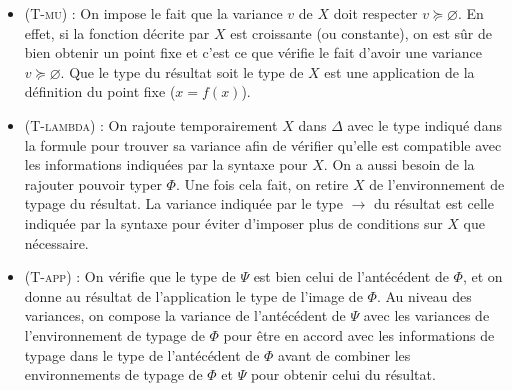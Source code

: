 \documentclass{rapport}
\theoremstyle{plain}
\theoremstyle{remark}
\theoremstyle{definition}
\begin{document}
\begin{itemize}
	\item (\textsc{T-mu}) : On impose le fait que la variance $v$ de $X$ doit respecter $v \succcurlyeq \varnothing$. En effet, si la fonction décrite par $X$ est croissante (ou constante), on est sûr de bien obtenir un point fixe et c'est ce que vérifie le fait d'avoir une variance $v \succcurlyeq \varnothing$. Que le type du résultat soit le type de $X$ est une application de la définition du point fixe ($x = f(x)$).
	\item (\textsc{T-lambda}) : On rajoute temporairement $X$ dans $\Delta$ avec  le type indiqué dans la formule pour trouver sa variance afin de vérifier qu'elle est compatible avec les informations indiquées par la syntaxe pour $X$. On a aussi besoin de la rajouter pouvoir typer $\Phi$. Une fois cela fait, on retire $X$ de l'environnement de typage du résultat. La variance indiquée par le type $\rightarrow$ du résultat est celle indiquée par la syntaxe pour éviter d'imposer plus de conditions sur $X$ que nécessaire. 
	\item (\textsc{T-app}) : On vérifie que le type de $\Psi$ est bien celui de l'antécédent de $\Phi$, et on donne au résultat de l'application le type de l'image de $\Phi$. Au niveau des variances, on compose la variance de l'antécédent de $\Psi$ avec les variances de l'environnement de typage de $\Phi$ pour être en accord avec les informations de typage dans le type de l'antécédent de $\Phi$ avant de combiner les environnements de typage de $\Phi$ et $\Psi$ pour obtenir celui du résultat. 
\end{itemize}
\end{document}
